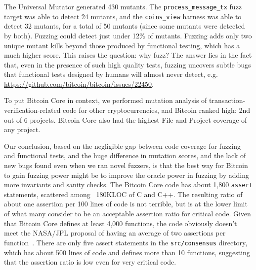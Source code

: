 



The Universal Mutator generated 430 mutants. The {\tt process\_message\_tx} fuzz target was
able to detect 24 mutants, and the {\tt coins\_view} harness was able to detect
32 mutants, for a total of 50 mutants (since some mutants were
detected by both). Fuzzing could detect just under 12\%
of mutants.   Fuzzing adds only two unique mutant kills beyond those produced by
functional testing, which has a much higher score.  This raises the question:  why fuzz?  
The answer lies in the fact that, even in the presence of such high quality tests, fuzzing
uncovers subtle bugs that functional tests designed by humans will
almost never detect, e.g. \url{https://github.com/bitcoin/bitcoin/issues/22450}.

To put Bitcoin Core in context, we performed mutation analysis
of transaction-verification-related code for other cryptocurrencies, and Bitcoin ranked high: 2nd out of 6 projects. Bitcoin Core
also had the highest File and Project coverage of any project.  

Our conclusion, based on the negligible gap between code coverage for fuzzing and functional tests, and the huge difference in mutation scores, and the lack of new bugs found even when we ran novel fuzzers, is that the best way for Bitcoin to gain fuzzing power might be to improve the oracle power in fuzzing by adding more invariants and sanity checks.  The Bitcoin Core code has about 1,800 {\tt assert}
statements, scattered among  ~180KLOC of C and C++.  The resulting ratio
of about one assertion per 100 lines of code is not terrible, but is
at the lower limit of what many consider to be an acceptable assertion
ratio for critical code.
Given that Bitcoin Core defines at least 4,000 functions, the code obviously
doesn't meet the NASA/JPL proposal of having an average of two
assertions per function~\cite{holzmann2006power}.  There are only five assert
statements in the {\tt src/consensus} directory, which has about 500
lines of code and defines more than 10 functions, suggesting that the assertion ratio is low even for very
critical code.

